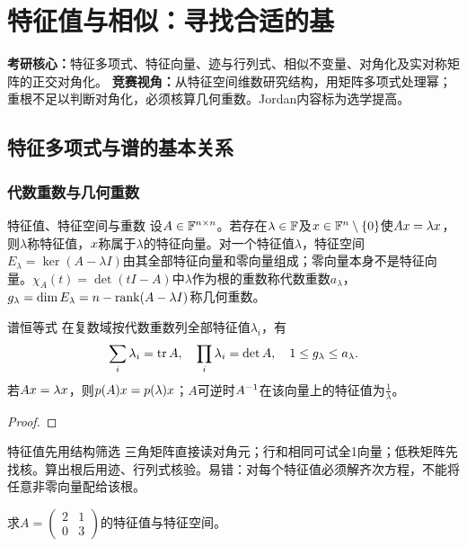 \chapter{特征值与相似：寻找合适的基}\label{ch:eigen}
\begin{examtip}
\textbf{考研核心：}特征多项式、特征向量、迹与行列式、相似不变量、对角化及实对称矩阵的正交对角化。
\textbf{竞赛视角：}从特征空间维数研究结构，用矩阵多项式处理幂；重根不足以判断对角化，必须核算几何重数。Jordan内容标为选学提高。
\end{examtip}
\section{特征多项式与谱的基本关系}
\subsection{代数重数与几何重数}
\begin{definition}{特征值、特征空间与重数}
设$A\in\mathbb{F}^{n\times n}$。若存在$\lambda\in\mathbb{F}$及$x\in\mathbb{F}^n\setminus\{0\}$使$Ax=\lambda x$，则$\lambda$称特征值，$x$称属于$\lambda$的特征向量。对一个特征值$\lambda$，特征空间$E_\lambda=\ker(A-\lambda I)$由其全部特征向量和零向量组成；零向量本身不是特征向量。$\chi_A(t)=\det(tI-A)$中$\lambda$作为根的重数称代数重数$a_\lambda$，$g_\lambda=\dim E_\lambda=n-\operatorname{rank}(A-\lambda I)$称几何重数。
\end{definition}
\begin{theorem}{谱恒等式}
在复数域按代数重数列全部特征值$\lambda_i$，有
\begin{equation}\sum_i\lambda_i=\operatorname{tr} A,\quad\prod_i\lambda_i=\det A,\quad
1\le g_\lambda\le a_\lambda.\label{eq:spectrum}
\end{equation}
若$Ax=\lambda x$，则$p(A)x=p(\lambda)x$；$A$可逆时$A^{-1}$在该向量上的特征值为$\frac{1}{\lambda}$。
\end{theorem}
\begin{proof}

\end{proof}
\begin{method}{特征值先用结构筛选}
三角矩阵直接读对角元；行和相同可试全1向量；低秩矩阵先找核。算出根后用迹、行列式核验。易错：对每个特征值必须解齐次方程，不能将任意非零向量配给该根。
\end{method}
{求$A=\begin{pmatrix}2&1\\0&3\end{pmatrix}$的特征值与特征空间。}
